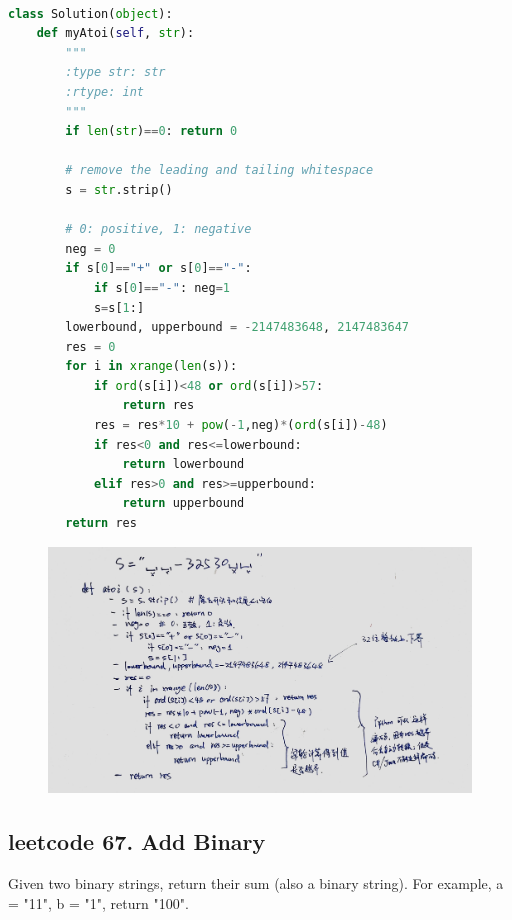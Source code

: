 \documentclass[a4paper,10pt]{article}
\begin{document}
\begin{lstlisting}[language=Python, caption=Problem8. String to Integer (atoi)]

class Solution(object):
    def myAtoi(self, str):
        """
        :type str: str
        :rtype: int
        """
        if len(str)==0: return 0
        
        # remove the leading and tailing whitespace
        s = str.strip()
        
        # 0: positive, 1: negative
        neg = 0 
        if s[0]=="+" or s[0]=="-": 
            if s[0]=="-": neg=1
            s=s[1:]
        lowerbound, upperbound = -2147483648, 2147483647
        res = 0
        for i in xrange(len(s)):
            if ord(s[i])<48 or ord(s[i])>57: 
                return res
            res = res*10 + pow(-1,neg)*(ord(s[i])-48)
            if res<0 and res<=lowerbound: 
                return lowerbound
            elif res>0 and res>=upperbound: 
                return upperbound
        return res
\end{lstlisting}

\begin{figure}[h]
    \includegraphics[width=\textwidth]{leetcode8.jpg}
    \centering \\
\end{figure}





\subsection{leetcode 67. Add Binary}
Given two binary strings, return their sum (also a binary string). For example, a = "11", b = "1", return "100". \\
\end{document}
